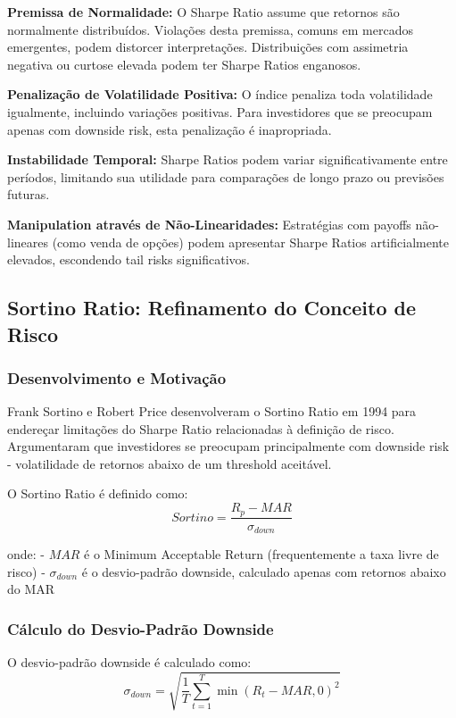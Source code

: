 \textbf{Premissa de Normalidade:} O Sharpe Ratio assume que retornos são normalmente distribuídos. Violações desta premissa, comuns em mercados emergentes, podem distorcer interpretações. Distribuições com assimetria negativa ou curtose elevada podem ter Sharpe Ratios enganosos.

\textbf{Penalização de Volatilidade Positiva:} O índice penaliza toda volatilidade igualmente, incluindo variações positivas. Para investidores que se preocupam apenas com downside risk, esta penalização é inapropriada.

\textbf{Instabilidade Temporal:} Sharpe Ratios podem variar significativamente entre períodos, limitando sua utilidade para comparações de longo prazo ou previsões futuras.

\textbf{Manipulation através de Não-Linearidades:} Estratégias com payoffs não-lineares (como venda de opções) podem apresentar Sharpe Ratios artificialmente elevados, escondendo tail risks significativos.

\subsection{Sortino Ratio: Refinamento do Conceito de Risco}

\subsubsection{Desenvolvimento e Motivação}

Frank Sortino e Robert Price desenvolveram o Sortino Ratio em 1994 para endereçar limitações do Sharpe Ratio relacionadas à definição de risco. Argumentaram que investidores se preocupam principalmente com downside risk - volatilidade de retornos abaixo de um threshold aceitável.

O Sortino Ratio é definido como:
\begin{equation}
Sortino = \frac{R_p - MAR}{\sigma_{down}}
\end{equation}

onde:
- $MAR$ é o Minimum Acceptable Return (frequentemente a taxa livre de risco)
- $\sigma_{down}$ é o desvio-padrão downside, calculado apenas com retornos abaixo do MAR

\subsubsection{Cálculo do Desvio-Padrão Downside}

O desvio-padrão downside é calculado como:
\begin{equation}
\sigma_{down} = \sqrt{\frac{1}{T} \sum_{t=1}^{T} \min(R_t - MAR, 0)^2}
\end{equation}

